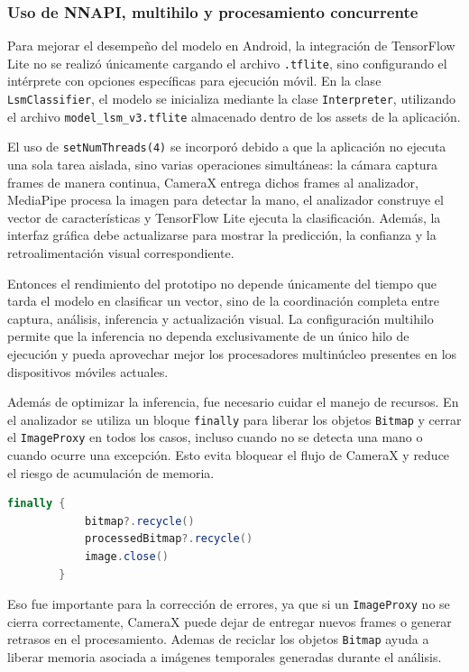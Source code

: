 	
	\subsubsection{Uso de NNAPI, multihilo y procesamiento concurrente}
	
	Para mejorar el desempeño del modelo en Android, la integración de TensorFlow Lite no se realizó únicamente cargando el archivo \texttt{.tflite}, sino configurando el intérprete con opciones específicas para ejecución móvil. En la clase \texttt{LsmClassifier}, el modelo se inicializa mediante la clase \texttt{Interpreter}, utilizando el archivo \texttt{model\_lsm\_v3.tflite} almacenado dentro de los assets de la aplicación.
	
	El uso de \texttt{setNumThreads(4)} se incorporó debido a que la aplicación no ejecuta una sola tarea aislada, sino varias operaciones simultáneas: la cámara captura frames de manera continua, CameraX entrega dichos frames al analizador, MediaPipe procesa la imagen para detectar la mano, el analizador construye el vector de características y TensorFlow Lite ejecuta la clasificación. Además, la interfaz gráfica debe actualizarse para mostrar la predicción, la confianza y la retroalimentación visual correspondiente.
	
	Entonces el rendimiento del prototipo no depende únicamente del tiempo que tarda el modelo en clasificar un vector, sino de la coordinación completa entre captura, análisis, inferencia y actualización visual. La configuración multihilo permite que la inferencia no dependa exclusivamente de un único hilo de ejecución y pueda aprovechar mejor los procesadores multinúcleo presentes en los dispositivos móviles actuales.

	Además de optimizar la inferencia, fue necesario cuidar el manejo de recursos. En el analizador se utiliza un bloque \texttt{finally} para liberar los objetos \texttt{Bitmap} y cerrar el \texttt{ImageProxy} en todos los casos, incluso cuando no se detecta una mano o cuando ocurre una excepción. Esto evita bloquear el flujo de CameraX y reduce el riesgo de acumulación de memoria.
	
	\begin{lstlisting}[language=Java]
		finally {
			bitmap?.recycle()
			processedBitmap?.recycle()
			image.close()
		}
	\end{lstlisting}
	
	Eso fue importante para la corrección de errores, ya que si un \texttt{ImageProxy} no se cierra correctamente, CameraX puede dejar de entregar nuevos frames o generar retrasos en el procesamiento. Ademas de reciclar los objetos \texttt{Bitmap} ayuda a liberar memoria asociada a imágenes temporales generadas durante el análisis.
	
